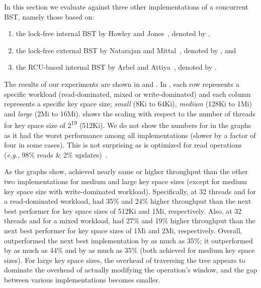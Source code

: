 In this section we evaluate \ICDCN{} against three other implementations of a concurrent BST, namely those based on:
\begin{enumerate}[label=(\roman*)]
\item the lock-free internal BST by Howley and Jones~\cite{HowJon:2012:SPAA}, denoted by \HJBST{},
\item the lock-free external BST by Natarajan and Mittal~\cite{NatMit:2014:PPoPP}, denoted by \NMBST{}, and 
\item the RCU-based internal BST by Arbel and Attiya~\cite{ArbAtt:2014:PODC}, denoted by \CITRUS{}.
\end{enumerate}




The results of our experiments are shown in  and . In , each row represents a specific workload (read-dominated, mixed or write-dominated) and each column represents a specific key space size; \textit{small} (8Ki to 64Ki), \textit{medium} (128Ki to 1Mi) and \textit{large} (2Mi to 16Mi).  shows the scaling with respect to the number of threads for key space size of 2\textsuperscript{19} (512Ki). We do not show the numbers for \CITRUS{} in the graphs as it had the worst performance among all implementations (slower by a factor of four in some cases). This is not surprising as \CITRUS{} is optimized for read operations (\emph{e.g.}, 98\% reads \& 2\% updates)~\cite{ArbAtt:2014:PODC}.


As the graphs show, \ICDCN{} achieved nearly same or higher throughput than the other two implementations for medium and large key space sizes (except for medium key space size with write-dominated workload). Specifically, at 32 threads and for a read-dominated workload, \ICDCN{} had 35\% and 24\% higher throughput than the next best performer for key space sizes of 512Ki and 1Mi, respectively. Also, at 32 threads and for a mixed workload, \ICDCN{} had 27\% and 19\% higher throughput than the next best performer for key space sizes of 1Mi and 2Mi, respectively. Overall, \ICDCN{} outperformed the next best implementation by as much as 35\%; it outperformed \HJBST{} by as much as 44\% and \NMBST{} by as much as 35\% (both achieved for medium key space sizes). For large key space sizes, the overhead of traversing the tree appears to dominate the overhead of actually modifying the operation's window, and the gap between various implementations becomes smaller.

